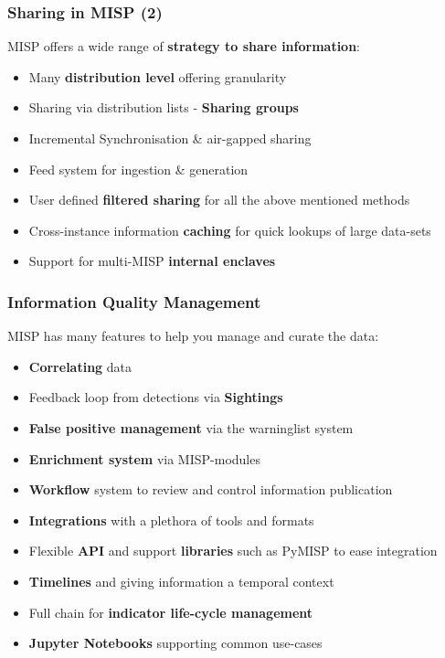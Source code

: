 \begin{frame}
    \frametitle{Sharing in MISP (2)}
    MISP offers a wide range of \textbf{strategy to share information}:
    \begin{itemize}
        \item Many {\bf distribution level} offering granularity
        \item Sharing via distribution lists - {\bf Sharing groups}
        \item Incremental Synchronisation \& air-gapped sharing
        \item Feed system for ingestion \& generation
        \item User defined {\bf filtered sharing} for all the above mentioned methods
        \item Cross-instance information {\bf caching} for quick lookups of large data-sets
        \item Support for multi-MISP \textbf{internal enclaves}
    \end{itemize}
\end{frame}

\begin{frame}
    \frametitle{Information Quality Management}
    MISP has many features to help you manage and curate the data:
    \begin{itemize}
        \item \textbf{Correlating} data
        \item Feedback loop from detections via {\bf Sightings}
        \item {\bf False positive management} via the warninglist system
        \item {\bf Enrichment system} via MISP-modules
        \item {\bf Workflow} system to review and control information publication
        \item {\bf Integrations} with a plethora of tools and formats
        \item Flexible {\bf API} and support {\bf libraries} such as PyMISP to ease integration
        \item {\bf Timelines} and giving information a temporal context
        \item Full chain for {\bf indicator life-cycle management}
        \item {\bf Jupyter Notebooks} supporting common use-cases
    \end{itemize}
\end{frame}

